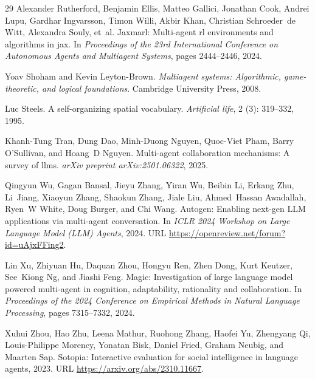 \begin{thebibliography}{29}
Alexander Rutherford, Benjamin Ellis, Matteo Gallici, Jonathan Cook, Andrei Lupu, Gardhar Ingvarsson, Timon Willi, Akbir Khan, Christian Schroeder~de Witt, Alexandra Souly, et~al.
\newblock Jaxmarl: Multi-agent rl environments and algorithms in jax.
\newblock In \emph{Proceedings of the 23rd International Conference on Autonomous Agents and Multiagent Systems}, pages 2444--2446, 2024.

Yoav Shoham and Kevin Leyton-Brown.
\newblock \emph{Multiagent systems: Algorithmic, game-theoretic, and logical foundations}.
\newblock Cambridge University Press, 2008.

Luc Steels.
\newblock A self-organizing spatial vocabulary.
\newblock \emph{Artificial life}, 2 (3): 319--332, 1995.

Khanh-Tung Tran, Dung Dao, Minh-Duong Nguyen, Quoc-Viet Pham, Barry O'Sullivan, and Hoang~D Nguyen.
\newblock Multi-agent collaboration mechanisms: A survey of llms.
\newblock \emph{arXiv preprint arXiv:2501.06322}, 2025.

Qingyun Wu, Gagan Bansal, Jieyu Zhang, Yiran Wu, Beibin Li, Erkang Zhu, Li~Jiang, Xiaoyun Zhang, Shaokun Zhang, Jiale Liu, Ahmed~Hassan Awadallah, Ryen~W White, Doug Burger, and Chi Wang.
\newblock Autogen: Enabling next-gen {LLM} applications via multi-agent conversation.
\newblock In \emph{ICLR 2024 Workshop on Large Language Model (LLM) Agents}, 2024.
\newblock URL \url{https://openreview.net/forum?id=uAjxFFing2}.

Lin Xu, Zhiyuan Hu, Daquan Zhou, Hongyu Ren, Zhen Dong, Kurt Keutzer, See~Kiong Ng, and Jiashi Feng.
\newblock Magic: Investigation of large language model powered multi-agent in cognition, adaptability, rationality and collaboration.
\newblock In \emph{Proceedings of the 2024 Conference on Empirical Methods in Natural Language Processing}, pages 7315--7332, 2024.

Xuhui Zhou, Hao Zhu, Leena Mathur, Ruohong Zhang, Haofei Yu, Zhengyang Qi, Louis-Philippe Morency, Yonatan Bisk, Daniel Fried, Graham Neubig, and Maarten Sap.
\newblock Sotopia: Interactive evaluation for social intelligence in language agents, 2023.
\newblock URL \url{https://arxiv.org/abs/2310.11667}.


\end{thebibliography}
